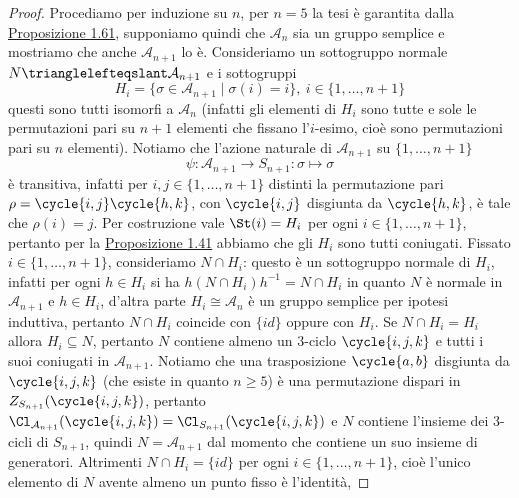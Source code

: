 \documentclass[11pt]{scrartcl}
\begin{document}
\begin{proof}
    Procediamo per induzione su $n$, per $n = 5$ la tesi è garantita dalla 
    \hyperref[prop1.61]{Proposizione 1.61}, supponiamo quindi che $\mathcal{A}_n$
    sia un gruppo semplice e mostriamo che anche $\mathcal{A}_{n + 1}$ lo è.
    Consideriamo un sottogruppo normale $N \trianglelefteqslant \mathcal{A}_{n + 1}$
    e i sottogruppi 
    \[
        H_i = \{\sigma \in \mathcal{A}_{n + 1}\mid \sigma(i) = i\},~
        i \in \{1, \ldots, n + 1\}
    \]
    questi sono tutti isomorfi a $\mathcal{A}_n$ (infatti
    gli elementi di $H_i$ sono tutte e sole le permutazioni pari su $n + 1$
    elementi che fissano l'$i$-esimo, cioè sono permutazioni pari su $n$ elementi).
    Notiamo che l'azione naturale di $\mathcal{A}_{n + 1}$ su $\{1, \ldots, n + 1\}$
    \[
        \psi:\mathcal{A}_{n + 1} \longrightarrow S_{n + 1} :\sigma \longmapsto \sigma
    \]
    è transitiva, infatti per $i, j \in \{1, \ldots, n + 1\}$ distinti 
    la permutazione pari $\rho =\nolinebreak \cycle{i, j}\cycle{h, k}$, con $\cycle{i, j}$
    disgiunta da $\cycle{h, k}$, è tale che $\rho(i) = j$. Per costruzione 
    vale $\St(i) = H_i$ per ogni $i \in \{1, \ldots, n + 1\}$, pertanto
    per la \hyperref[prop1.41]{Proposizione 1.41} abbiamo che gli $H_i$ sono 
    tutti coniugati.\newline
    Fissato $i \in \{1, \ldots, n + 1\}$, consideriamo $N \cap H_i$: questo
    è un sottogruppo normale di $H_i$, infatti per ogni $h \in H_i$ si ha 
    $h(N\cap H_i)h^{-1} = N\cap H_i$ in quanto $N$ è normale in $\mathcal{A}_{n + 1}$
    e $h \in H_i$, d'altra parte $H_i \cong \mathcal{A}_n$ è un gruppo semplice
    per ipotesi induttiva, pertanto $N\cap H_i$ coincide con $\{id\}$ oppure 
    con $H_i$. \newline
    Se $N \cap H_i = H_i$ allora $H_i \subseteq N$, pertanto $N$ 
    contiene almeno un 3-ciclo $\cycle{i, j, k}$ e tutti i suoi coniugati in 
    $\mathcal{A}_{n + 1}$. Notiamo che una trasposizione $\cycle{a, b}$
    disgiunta da $\cycle{i, j, k}$ (che esiste in quanto $n \geq 5$) è una
    permutazione dispari in $Z_{S_{n + 1}}(\cycle{i, j, k})$, pertanto 
    $\Cl_{\mathcal{A}_{n + 1}}(\cycle{i, j, k}) = \Cl_{S_{n + 1}}(\cycle{i, j, k})$
    e $N$ contiene l'insieme dei 3-cicli di $S_{n + 1}$, quindi $N = 
    \mathcal{A}_{n + 1}$ dal momento che contiene un suo insieme di generatori.
    \newline
    Altrimenti $N\cap H_i = \{id\}$ per ogni $i \in \{1, \ldots, n + 1\}$,
    cioè l'unico elemento di $N$ avente almeno un punto fisso è l'identità,

\end{proof}
\end{document}
